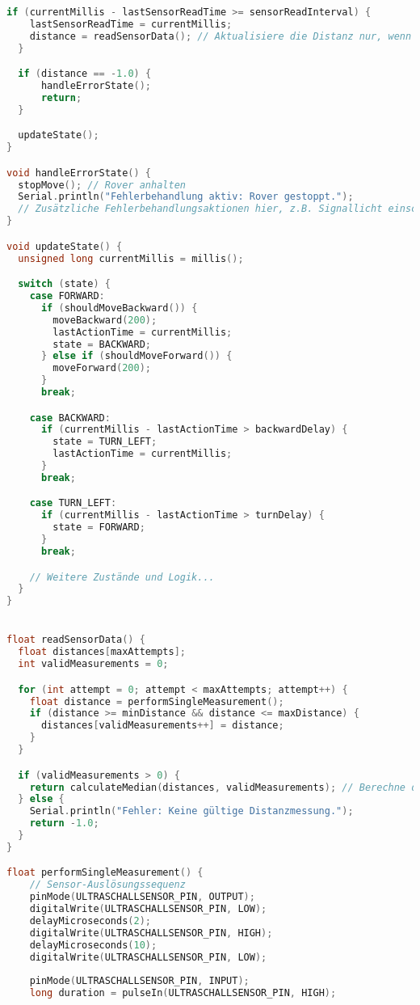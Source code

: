 \documentclass{vorlage-design-main}
\begin{document}
\begin{lstlisting}[language={C++}]
  if (currentMillis - lastSensorReadTime >= sensorReadInterval) {
    lastSensorReadTime = currentMillis;
    distance = readSensorData(); // Aktualisiere die Distanz nur, wenn eine neue Messung erfolgt
  }

  if (distance == -1.0) {
      handleErrorState();
      return;
  }

  updateState();
}

void handleErrorState() {
  stopMove(); // Rover anhalten
  Serial.println("Fehlerbehandlung aktiv: Rover gestoppt.");
  // Zusätzliche Fehlerbehandlungsaktionen hier, z.B. Signallicht einschalten, etc.
}

void updateState() {
  unsigned long currentMillis = millis();

  switch (state) {
    case FORWARD:
      if (shouldMoveBackward()) {
        moveBackward(200);
        lastActionTime = currentMillis;
        state = BACKWARD;
      } else if (shouldMoveForward()) {
        moveForward(200);
      }
      break;

    case BACKWARD:
      if (currentMillis - lastActionTime > backwardDelay) {
        state = TURN_LEFT;
        lastActionTime = currentMillis;
      }
      break;

    case TURN_LEFT:
      if (currentMillis - lastActionTime > turnDelay) {
        state = FORWARD;
      }
      break;

    // Weitere Zustände und Logik...
  }
}


float readSensorData() {
  float distances[maxAttempts];
  int validMeasurements = 0;

  for (int attempt = 0; attempt < maxAttempts; attempt++) {
    float distance = performSingleMeasurement();
    if (distance >= minDistance && distance <= maxDistance) {
      distances[validMeasurements++] = distance;
    }
  }

  if (validMeasurements > 0) {
    return calculateMedian(distances, validMeasurements); // Berechne den Median der gültigen Messungen
  } else {
    Serial.println("Fehler: Keine gültige Distanzmessung.");
    return -1.0;
  }
}

float performSingleMeasurement() {
    // Sensor-Auslösungssequenz
    pinMode(ULTRASCHALLSENSOR_PIN, OUTPUT);
    digitalWrite(ULTRASCHALLSENSOR_PIN, LOW);
    delayMicroseconds(2);
    digitalWrite(ULTRASCHALLSENSOR_PIN, HIGH);
    delayMicroseconds(10);
    digitalWrite(ULTRASCHALLSENSOR_PIN, LOW);
    
    pinMode(ULTRASCHALLSENSOR_PIN, INPUT);
    long duration = pulseIn(ULTRASCHALLSENSOR_PIN, HIGH);
    

\end{lstlisting}
\end{document}
